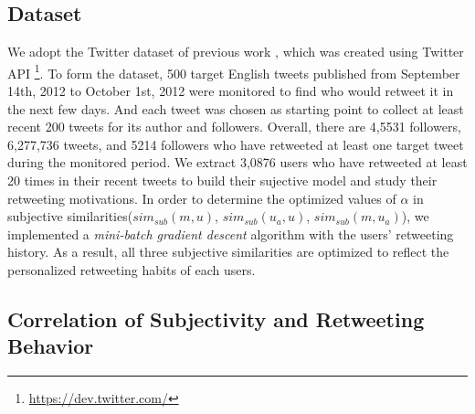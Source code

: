 \documentclass[letterpaper]{article}
\begin{document}
\subsection{Dataset}
We adopt the Twitter dataset of previous work \cite{Luo:2013RMF}, which was created using Twitter API \footnote{\url{https://dev.twitter.com/}}. 
To form the dataset, 500 target English tweets published from September 14th, 2012 to October 1st, 2012 were monitored to find who would retweet it in the next few days. 
And each tweet was chosen as starting point to collect at least recent 200 tweets for its author and followers.
Overall, there are 4,5531 followers, 6,277,736 tweets, and 5214 followers who have retweeted at least one target tweet during the monitored period. 
We extract 3,0876 users who have retweeted at least 20 times in their recent tweets to build their sujective model and study their retweeting motivations. 
In order to determine the optimized values of $ \alpha $ in subjective similarities($ sim_{sub} \left( m,u \right) $, $ sim_{sub}\left( u_{a},u \right)  $, $ sim_{sub}\left( m,u_{a} \right)  $), we implemented a \textit{mini-batch gradient descent} algorithm with the users' retweeting history. As a result, all three subjective similarities are optimized to reflect the personalized retweeting habits of each users.

\subsection{Correlation of Subjectivity and Retweeting Behavior}
\end{document}
